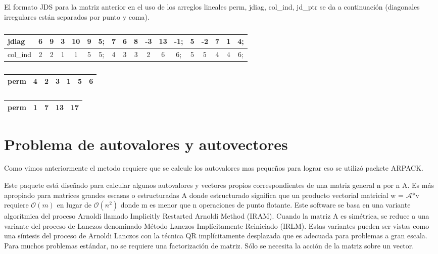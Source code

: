 \documentclass[a4paper,openright,12pt, oneside]{book}
\DeclareRobustCommand{\orderof}{\ensuremath{\mathcal{O}}}
\begin{document}
El formato JDS para la matriz anterior en el uso de los arreglos lineales {perm, jdiag, col\_ind, jd\_ptr} se da a continuaci\'on (diagonales irregulares est\'an separados por punto y coma).

\begin{table}[htdp]
    \caption{}
    \begin{tabular}{ | l || c | c | c | c | c | c | c | c | c | c | c | c | c | c | c | c | c |}
        \hline
      jdiag & 6 & 9 & 3 & 10 & 9 & 5; & 7 & 6 & 8 & -3 & 13 & -1; & 5 & -2 & 7 & 1 & 4; \\ \hline
      col\_ind & 2 & 2 & 1 & 1 & 5 & 5; & 4 & 3 & 3 & 2 & 6 & 6; & 5 & 5 & 4 & 4 & 6; \\ \hline
    \end{tabular}
\end{table}

\begin{table}[htdp]
    \caption{}
    \begin{tabular}{ | l || c | c | c | c | c | c |}
        \hline
        perm & 4 & 2 & 3 & 1 & 5 & 6 \\ \hline
    \end{tabular}
\end{table}

\begin{table}[htdp]
    \caption{}
    \begin{tabular}{ | l || c | c | c | c | }
        \hline
      perm & 1 & 7 & 13 & 17 \\ \hline
    \end{tabular}
\end{table}



\section{Problema de autovalores y autovectores}

Como vimos anteriormente el metodo requiere que se calcule los autovalores mas peque\~nos para lograr eso se utiliz\'o packete ARPACK.

Este paquete est\'a dise\~nado para calcular algunos autovalores y vectores propios correspondientes de una matriz general n por n A. Es m\'as apropiado para matrices grandes escasas o estructuradas A donde estructurado significa que un producto vectorial matricial w = $\mathcal{A}$*v requiere $\orderof(m)$ en lugar de $\orderof(n^{2})$ donde m es menor que n operaciones de punto flotante. Este software se basa en una variante algor\'itmica del proceso Arnoldi llamado Implicitly Restarted Arnoldi Method (IRAM). Cuando la matriz A es sim\'etrica, se reduce a una variante del proceso de Lanczos denominado M\'etodo Lanczos Impl\'icitamente Reiniciado (IRLM). Estas variantes pueden ser vistas como una s\'intesis del proceso de Arnoldi\/ Lanczos con la t\'ecnica QR impl\'icitamente desplazada que es adecuada para problemas a gran escala. Para muchos problemas est\'andar, no se requiere una factorizaci\'on de matriz. S\'olo se necesita la acci\'on de la matriz sobre un vector.
\end{document}
